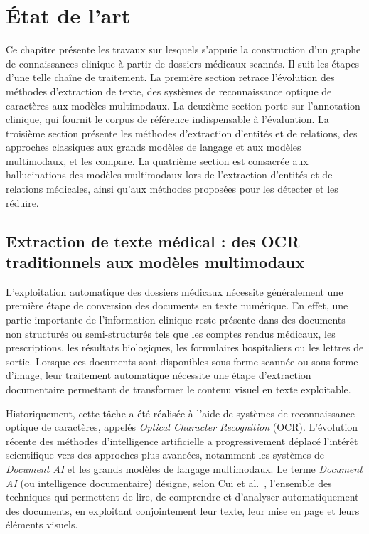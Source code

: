 \chapter{État de l'art}

Ce chapitre présente les travaux sur lesquels s'appuie la construction d'un graphe de connaissances clinique à partir de dossiers médicaux scannés. Il suit les étapes d'une telle chaîne de traitement. La première section retrace l'évolution des méthodes d'extraction de texte, des systèmes de reconnaissance optique de caractères aux modèles multimodaux. La deuxième section porte sur l'annotation clinique, qui fournit le corpus de référence indispensable à l'évaluation. La troisième section présente les méthodes d'extraction d'entités et de relations, des approches classiques aux grands modèles de langage et aux modèles multimodaux, et les compare. La quatrième section est consacrée aux hallucinations des modèles multimodaux lors de l'extraction d'entités et de relations médicales, ainsi qu'aux méthodes proposées pour les détecter et les réduire.

\section{Extraction de texte médical : des OCR traditionnels aux modèles multimodaux}

L'exploitation automatique des dossiers médicaux nécessite généralement une première étape de conversion des documents en texte numérique. En effet, une partie importante de l'information clinique reste présente dans des documents non structurés ou semi-structurés tels que les comptes rendus médicaux, les prescriptions, les résultats biologiques, les formulaires hospitaliers ou les lettres de sortie. Lorsque ces documents sont disponibles sous forme scannée ou sous forme d'image, leur traitement automatique nécessite une étape d'extraction documentaire permettant de transformer le contenu visuel en texte exploitable.

Historiquement, cette tâche a été réalisée à l'aide de systèmes de reconnaissance optique de caractères, appelés \textit{Optical Character Recognition} (OCR). L'évolution récente des méthodes d'intelligence artificielle a progressivement déplacé l'intérêt scientifique vers des approches plus avancées, notamment les systèmes de \textit{Document AI} et les grands modèles de langage multimodaux. Le terme \textit{Document AI} (ou intelligence documentaire) désigne, selon Cui et al.~\cite{cui2021documentai}, l'ensemble des techniques qui permettent de lire, de comprendre et d'analyser automatiquement des documents, en exploitant conjointement leur texte, leur mise en page et leurs éléments visuels.

